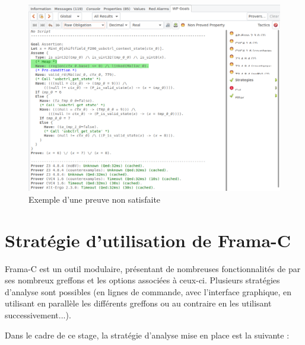 \begin{figure}[!h]
\centering
\includegraphics[width=18cm]{images/details_preuve_wp_GUI.png}
\caption{Exemple d'une preuve non satisfaite}
\label{Exemple d'une preuve non satisfaite}
\end{figure}

\newpage

\section{Stratégie d'utilisation de Frama-C}\label{strategie}

Frama-C est un outil modulaire, présentant de nombreuses fonctionnalités de par ses nombreux greffons et les options associées à ceux-ci. Plusieurs stratégies d'analyse sont possibles (en lignes de commande, avec l'interface graphique, en utilisant en parallèle les différents greffons ou au contraire en les utilisant successivement...).

Dans le cadre de ce stage, la stratégie d'analyse mise en place est la suivante :

